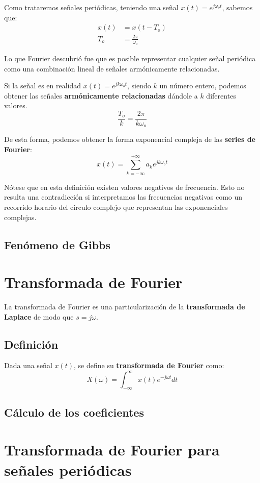 \documentclass[a4paper]{book}
\begin{document}
Como trataremos señales periódicas, teniendo una señal $x(t) = e^{j\omega_ot}$, sabemos que:
\begin{align*}
	x(t) & = x\left( t-T_o \right) \\
	T_o  & = \frac{2\pi}{\omega_o}
\end{align*}

Lo que Fourier descubrió fue que es posible representar cualquier señal periódica como una combinación lineal de señales armónicamente relacionadas.

Si la señal es en realidad $x(t) = e^{jk\omega_ot}$, siendo $k$ un número entero, podemos obtener las señales \textbf{armónicamente relacionadas} dándole a $k$ diferentes valores.
\[\frac{T_o}{k} = \frac{2\pi}{k\omega_o}\]

De esta forma, podemos obtener la forma exponencial compleja de las \textbf{series de Fourier}:
\[\boxed{x(t) = \sum^{+\infty}_{k=-\infty}{a_ke^{jk\omega_ot}}}\]

Nótese que en esta definición existen valores negativos de frecuencia. Esto no resulta una contradicción si interpretamos las frecuencias negativas como un recorrido horario del círculo complejo que representan las exponenciales complejas.

\subsection{Fenómeno de Gibbs}

\section{Transformada de Fourier} \label{sec:Transformada_de_Fourier}
La transformada de Fourier es una particularización de la \textbf{transformada de Laplace} de modo que $s=j\omega$.
\subsection{Definición}
Dada una señal $x(t)$, se define su \textbf{transformada de Fourier} como: \[\boxed{X(\omega ) = \int_{-\infty}^{\infty}{x(t) e^{-j\omega t}dt}}\]

\subsection{Cálculo de los coeficientes}

\section{Transformada de Fourier para señales periódicas}
\end{document}
